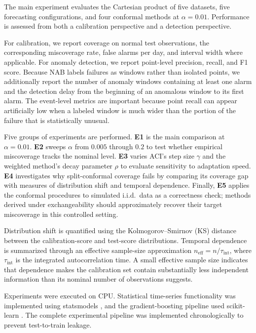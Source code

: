 \documentclass[11pt]{article}
\theoremstyle{definition}
\theoremstyle{remark}
\begin{document}
The main experiment evaluates the Cartesian product of five datasets, five forecasting configurations, and four conformal methods at $\alpha = 0.01$. Performance is assessed from both a calibration perspective and a detection perspective.

For calibration, we report coverage on normal test observations, the corresponding miscoverage rate, false alarms per day, and interval width where applicable. For anomaly detection, we report point-level precision, recall, and F1 score. Because NAB labels failures as windows rather than isolated points, we additionally report the number of anomaly windows containing at least one alarm and the detection delay from the beginning of an anomalous window to its first alarm. The event-level metrics are important because point recall can appear artificially low when a labeled window is much wider than the portion of the failure that is statistically unusual.

Five groups of experiments are performed. \textbf{E1} is the main comparison at $\alpha = 0.01$. \textbf{E2} sweeps $\alpha$ from $0.005$ through $0.2$ to test whether empirical miscoverage tracks the nominal level. \textbf{E3} varies ACI's step size $\gamma$ and the weighted method's decay parameter $\rho$ to evaluate sensitivity to adaptation speed. \textbf{E4} investigates why split-conformal coverage fails by comparing its coverage gap with measures of distribution shift and temporal dependence. Finally, \textbf{E5} applies the conformal procedures to simulated i.i.d.\ data as a correctness check; methods derived under exchangeability should approximately recover their target miscoverage in this controlled setting.

Distribution shift is quantified using the Kolmogorov--Smirnov (KS) distance between the calibration-score and test-score distributions. Temporal dependence is summarized through an effective sample-size approximation $n_{\mathrm{eff}} = n/\tau_{\mathrm{int}}$, where $\tau_{\mathrm{int}}$ is the integrated autocorrelation time. A small effective sample size indicates that dependence makes the calibration set contain substantially less independent information than its nominal number of observations suggests.

Experiments were executed on CPU. Statistical time-series functionality was implemented using statsmodels \cite{seabold2010statsmodels}, and the gradient-boosting pipeline used scikit-learn \cite{pedregosa2011scikit}. The complete experimental pipeline was implemented chronologically to prevent test-to-train leakage.
\end{document}
